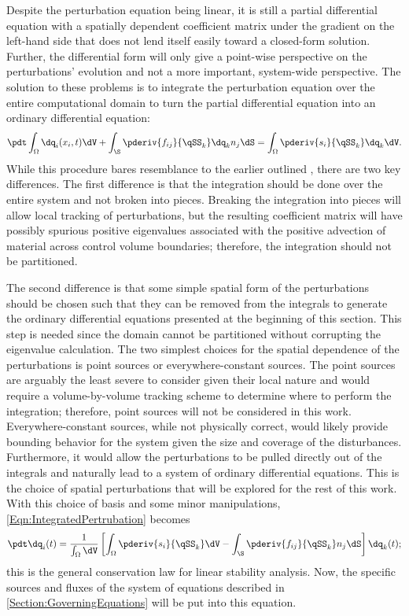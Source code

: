 Despite the perturbation equation being linear, it is still a partial differential equation with a spatially dependent coefficient matrix under the gradient on the left-hand side that does not lend itself easily toward a closed-form solution.
Further, the differential form will only give a point-wise perspective on the perturbations' evolution and not a more important, system-wide perspective.
The solution to these problems is to integrate the perturbation equation over the entire computational domain to turn the partial differential equation into an ordinary differential equation:
\begin{equation}
    \pdt\int_\Omega \dq_i(x_i,t)\dV + \int_\S\pderiv{f_{ij}}{\qSS_k{}} \dq_k n_j\dS = \int_\Omega\pderiv{s_i}{\qSS_k{}}\dq_k \dV.
    \label{Eqn:IntegratedPertrubation}
\end{equation}
While this procedure bares resemblance to the earlier outlined , there are two key differences.
The first difference is that the integration should be done over the entire system and not broken into pieces.
Breaking the integration into pieces will allow local tracking of perturbations, but the resulting coefficient matrix will have possibly spurious positive eigenvalues associated with the positive advection of material across control volume boundaries; therefore, the integration should not be partitioned.

The second difference is that some simple spatial form of the perturbations should be chosen such that they can be removed from the integrals to generate the ordinary differential equations presented at the beginning of this section.
This step is needed since the domain cannot be partitioned without corrupting the eigenvalue calculation.
The two simplest choices for the spatial dependence of the perturbations is point sources or everywhere-constant sources.
The point sources are arguably the least severe to consider given their local nature and would require a volume-by-volume tracking scheme to determine where to perform the integration; therefore, point sources will not be considered in this work.
Everywhere-constant sources, while not physically correct, would likely provide bounding behavior for the system given the size and coverage of the disturbances.
Furthermore, it would allow the perturbations to be pulled directly out of the integrals and naturally lead to a system of ordinary differential equations.
This is the choice of spatial perturbations that will be explored for the rest of this work.
With this choice of basis and some minor manipulations, \cref{Eqn:IntegratedPertrubation} becomes
\begin{equation}
    \pdt\dq_i(t) = \frac{1}{\int_\Omega \dV} \left[\int_\Omega\pderiv{s_i}{\qSS_k{}}\dV - \int_\S\pderiv{f_{ij}}{\qSS_k{}}n_j\dS\right] \dq_k(t);
\end{equation}
this is the general conservation law for linear stability analysis.
Now, the specific sources and fluxes of the system of equations described in \cref{Section:GoverningEquations} will be put into this equation.




